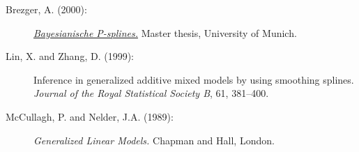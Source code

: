 \begin{description}
\item[Brezger, A. (2000):]
\href{http://www.stat.uni-muenchen.de/~andib} {\em Bayesianische
P-splines.} Master thesis, University of Munich.

\item[Lin, X. and Zhang, D. (1999):] Inference in generalized additive mixed models by using
smoothing splines. {\it Journal of the Royal Statistical Society
B}, 61, 381--400.

\item[McCullagh, P. and Nelder, J.A. (1989):] {\em Generalized Linear Models.} Chapman and Hall, London.

\end{description}
